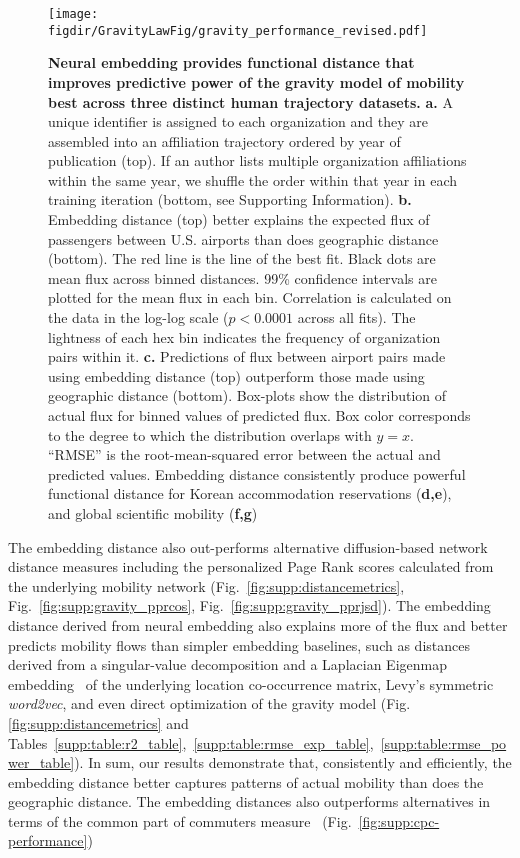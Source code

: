 \documentclass[12pt]{article} %
\def\figdir{../Figs}
\def\SI{Supporting Information}
\begin{document}
%
%
%
%
\begin{figure}[!htp]
	\centering
	\texttt{[image: \\figdir/GravityLawFig/gravity\_performance\_revised.pdf]}
	\caption{
		\textbf{Neural embedding provides functional distance that improves predictive power of the gravity model of mobility best across three distinct human trajectory datasets. }
		\textbf{a.} A unique identifier is assigned to each organization and they are assembled into an affiliation trajectory ordered by year of publication (top). If an author lists multiple organization affiliations within the same year,  we shuffle the order within that year in each training iteration (bottom, see \SI).
		\textbf{b.} Embedding distance (top) better explains the expected flux of passengers between U.S. airports than does geographic distance (bottom).
		The red line is the line of the best fit.
		Black dots are mean flux across binned distances.
		99\% confidence intervals are plotted for the mean flux in each bin.
		Correlation is calculated on the data in the log-log scale ($p < 0.0001$ across all fits).
		The lightness of each hex bin indicates the frequency of organization pairs within it.
		\textbf{c.} Predictions of flux between airport pairs made using embedding distance (top) outperform those made using geographic distance (bottom).
		Box-plots show the distribution of actual flux for binned values of predicted flux.
		Box color corresponds to the degree to which the distribution overlaps with $y = x$.
		``RMSE'' is the root-mean-squared error between the actual and predicted values.
	Embedding distance consistently produce powerful functional distance for Korean accommodation reservations (\textbf{d,e}), and global scientific mobility (\textbf{f,g})}
	\label{fig:gravity_performance}
\end{figure}

The embedding distance also out-performs alternative diffusion-based network distance measures including the personalized Page Rank scores calculated from the underlying mobility network (Fig.~\ref{fig:supp:distancemetrics}, Fig.~\ref{fig:supp:gravity_pprcos}, Fig.~\ref{fig:supp:gravity_pprjsd}).
The embedding distance derived from neural embedding also explains more of the flux and better predicts mobility flows than simpler embedding baselines, such as distances derived from a singular-value decomposition and a Laplacian Eigenmap embedding~\autocite{belkin2003laplacian} of the underlying location co-occurrence matrix, Levy's symmetric \textit{word2vec}\autocite{levy2014neural}, and even direct optimization of the gravity model (Fig.\ref{fig:supp:distancemetrics} and Tables~\ref{supp:table:r2_table},~\ref{supp:table:rmse_exp_table},~\ref{supp:table:rmse_power_table}).
In sum, our results demonstrate that, consistently and efficiently, the embedding distance better captures patterns of actual mobility than does the geographic distance.
The embedding distances also outperforms alternatives in terms of the common part of commuters measure~\autocite{sorensen1948method} (Fig.~\ref{fig:supp:cpc-performance})
\end{document}
